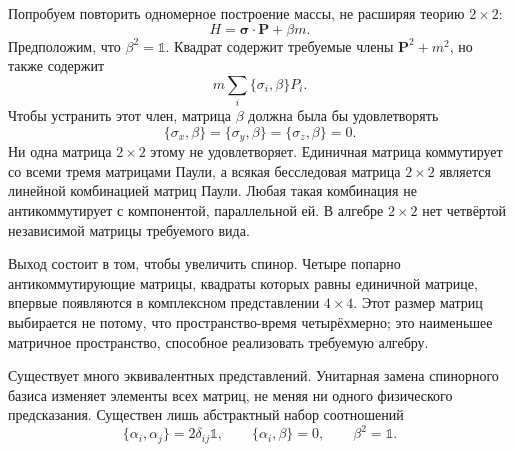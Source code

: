 Попробуем повторить одномерное построение массы, не расширяя теорию \(2\times2\):
\begin{equation}
H=\boldsymbol{\sigma}\cdot\mathbf P+\beta m.
\label{eq:l10-failed-mass}
\end{equation}
Предположим, что \(\beta^2=\mathbb{1}\). Квадрат содержит требуемые члены \(\mathbf P^2+m^2\), но также содержит
\begin{equation}
m\sum_i\{\sigma_i,\beta\}P_i.
\end{equation}
Чтобы устранить этот член, матрица \(\beta\) должна была бы удовлетворять
\begin{equation}
\{\sigma_x,\beta\}
=
\{\sigma_y,\beta\}
=
\{\sigma_z,\beta\}
=0.
\label{eq:l10-impossible-beta}
\end{equation}
Ни одна матрица \(2\times2\) этому не удовлетворяет. Единичная матрица коммутирует со всеми тремя матрицами Паули, а всякая бесследовая матрица \(2\times2\) является линейной комбинацией матриц Паули. Любая такая комбинация не антикоммутирует с компонентой, параллельной ей. В алгебре \(2\times2\) нет четвёртой независимой матрицы требуемого вида.

Выход состоит в том, чтобы увеличить спинор. Четыре попарно антикоммутирующие матрицы, квадраты которых равны единичной матрице, впервые появляются в комплексном представлении \(4\times4\). Этот размер матриц выбирается не потому, что пространство-время четырёхмерно; это наименьшее матричное пространство, способное реализовать требуемую алгебру.

Существует много эквивалентных представлений. Унитарная замена спинорного базиса изменяет элементы всех матриц, не меняя ни одного физического предсказания. Существен лишь абстрактный набор соотношений
\begin{equation}
\{\alpha_i,\alpha_j\}=2\delta_{ij}\mathbb{1},
\qquad
\{\alpha_i,\beta\}=0,
\qquad
\beta^2=\mathbb{1}.
\label{eq:l10-dirac-algebra}
\end{equation}

\begin{classroomqa}
\end{classroomqa}

